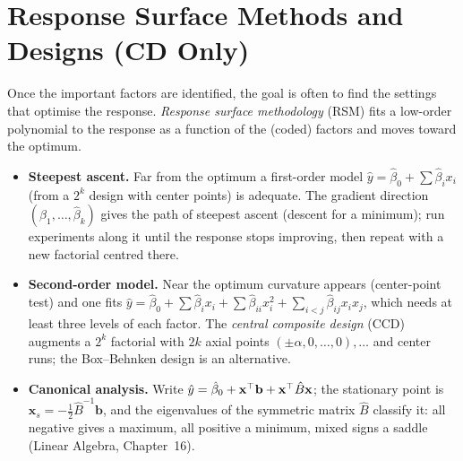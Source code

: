 \section{Response Surface Methods and Designs (CD Only)}

Once the important factors are identified, the goal is often to find the settings that optimise the response. \emph{Response surface methodology} (RSM) fits a low-order polynomial to the response as a function of the (coded) factors and moves toward the optimum.

\begin{itemize}
  \item \textbf{Steepest ascent.} Far from the optimum a first-order model $\hat{y}=\hat\beta_0+\sum\hat\beta_ix_i$ (from a $2^k$ design with center points) is adequate. The gradient direction $(\hat\beta_1,\dots,\hat\beta_k)$ gives the path of steepest ascent (descent for a minimum); run experiments along it until the response stops improving, then repeat with a new factorial centred there.
  \item \textbf{Second-order model.} Near the optimum curvature appears (center-point test) and one fits $\hat{y}=\hat\beta_0+\sum\hat\beta_ix_i+\sum\hat\beta_{ii}x_i^2+\sum_{i<j}\hat\beta_{ij}x_ix_j$, which needs at least three levels of each factor. The \emph{central composite design} (CCD) augments a $2^k$ factorial with $2k$ axial points $(\pm\alpha,0,\dots,0),\dots$ and center runs; the Box--Behnken design is an alternative.
  \item \textbf{Canonical analysis.} Write $\hat{y}=\hat\beta_0+\mathbf{x}^{\top}\mathbf{b}+\mathbf{x}^{\top}\hat{B}\mathbf{x}$; the stationary point is $\mathbf{x}_s=-\tfrac12\hat{B}^{-1}\mathbf{b}$, and the eigenvalues of the symmetric matrix $\hat{B}$ classify it: all negative gives a maximum, all positive a minimum, mixed signs a saddle (Linear Algebra, Chapter~16).
\end{itemize}

